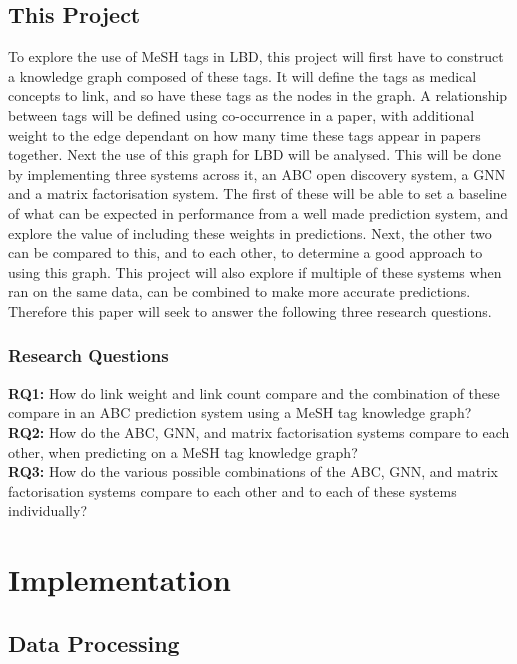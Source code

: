 \documentclass{l4proj}
\begin{document}
\section{This Project}

To explore the use of MeSH tags in LBD, this project will first have to construct a knowledge graph composed of these tags. It will define the tags as medical concepts to link, and so have these tags as the nodes in the graph. A relationship between tags will be defined using co-occurrence in a paper, with additional weight to the edge dependant on how many time these tags appear in papers together. Next the use of this graph for LBD will be analysed. This will be done by implementing three systems across it, an ABC open discovery system, a GNN and a matrix factorisation system. The first of these will be able to set a baseline of what can be expected in performance from a well made prediction system, and explore the value of including these weights in predictions. Next, the other two can be compared to this, and to each other, to determine a good approach to using this graph. This project will also explore if multiple of these systems when ran on the same data, can be combined to make more accurate predictions. Therefore this paper will seek to answer the following three research questions. \\

\subsection{Research Questions}

\textbf{RQ1:} How do link weight and link count compare and the combination of these compare in an ABC prediction system using a MeSH tag knowledge graph? \\

\textbf{RQ2:} How do the ABC, GNN, and matrix factorisation systems compare to each other, when predicting on a MeSH tag knowledge graph? \\

\textbf{RQ3:} How do the various possible combinations of the ABC, GNN, and matrix factorisation systems compare to each other and to each of these systems individually? \\

\chapter{Implementation}

\section{Data Processing}
\end{document}
